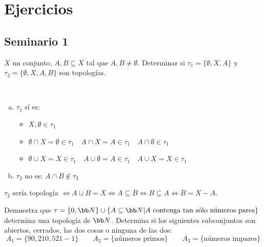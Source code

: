 \chapter{Ejercicios} \justifying
\section{Seminario 1}
\begin{ejer}
    [1]
\end{ejer}
\begin{ejer}
    [2] $X$ un conjunto, $A,B \subseteq X$ tal que $A,B \neq \emptyset$. Determinar si $\tau_1 = \{\emptyset, X, A\}$ y $\tau_2 = \{\emptyset, X, A, B\}$ son topolog\'ias. 
\end{ejer}
\begin{sol}\, 
   \begin{enumerate}[a)]
    \item $\tau_1$ s\'i es:
    \begin{itemize}
        \item $X, \emptyset \in \tau_1$
        \item $\emptyset\cap X = \emptyset \in \tau_1 \quad A\cap X = A \in \tau_1 \quad A \cap \emptyset \in \tau_1$
        \item  $\emptyset\cup X =X \in \tau_1\quad A \cup \emptyset = A \in \tau_1 \quad A\cup X = X \in \tau_1 $
    \end{itemize}
    \item $\tau_2$ no es: $A\cap B \nin \tau_2$
   \end{enumerate} 
   $\tau_2$ ser\'ia topolog\'ia $\iff A\sqcup B = X \iff A\subseteq B \iff B\subseteq A \iff B = X-A$.
\end{sol}
\begin{ejer}
    [3] Demuestra que $\tau = \{0,\bb N\} \cup \{A \subseteq \bb N | A \text{ contenga tan sólo números pares}\}$ determina una topología de $\bb N$. Determina si los siguientes subconjuntos son abiertos, cerrados, las dos cosas o ninguna de las dos:
    $$ A_1 = \{90,210,521 -1\}\qquad  A_2 = \{\text{números primos}\} \qquad  A_3 = \{\text{números impares}\}$$
\end{ejer}
